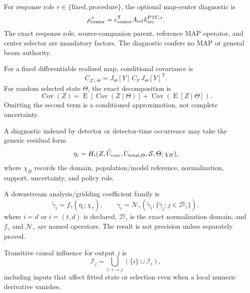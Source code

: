 For response role $r\in\{\mathrm{fixed},\mathrm{procedure}\}$, the optional
map-center diagnostic is
\begin{equation}
\rho_{\rm center}^{\,r}
=e_{\rm center}^{\mathsf T}A_{\rm ref}k_{\rm src}^{\rm PTC,r}.
\label{eq:map-center}
\end{equation}
The exact response role, source-companion parent, reference MAP operator, and
center selector are mandatory factors. The diagnostic confers no MAP or
general beam authority.

For a fixed differentiable realized map, conditional covariance is
\begin{equation}
C_{Z\mid\Theta}=J_{\Theta}[Y]\,C_Y\,J_{\Theta}[Y]^{\mathsf T}.
\label{eq:conditional-covariance}
\end{equation}
For random selected state $\Theta$, the exact decomposition is
\begin{equation}
\operatorname{Cov}(Z)=
\operatorname{E}\!\left[\operatorname{Cov}(Z\mid\Theta)\right]
+\operatorname{Cov}\!\left(\operatorname{E}[Z\mid\Theta]\right).
\label{eq:total-covariance}
\end{equation}
Omitting the second term is a conditioned approximation, not complete
uncertainty.

A diagnostic indexed by detector or detector-time occurrence may take the
generic residual form
\begin{equation}
\eta_i=H_i(Z,\widehat U_{\rm corr},U_{{\rm total},\Theta},
\mathcal S,\Theta;\chi_H),
\label{eq:diagnostic}
\end{equation}
where $\chi_H$ records the domain, population/model reference, normalization,
support, uncertainty, and policy role.

A downstream analysis/gridding coefficient family is
\begin{equation}
\widetilde\gamma_i=f_{\gamma}(\eta_i;\chi_{\gamma}),
\qquad
\gamma_i=
\mathcal N_{\gamma}\!\left(
\widetilde\gamma_i;\{\widetilde\gamma_j:j\in\mathcal D_{\gamma}\}\right),
\label{eq:analysis-coefficient}
\end{equation}
where $i=d$ or $i=(t,d)$ is declared, $\mathcal D_{\gamma}$ is the exact
normalization domain, and $f_{\gamma}$ and $\mathcal N_{\gamma}$ are named
operators. The result is not precision unless separately proved.

Transitive causal influence for output $j$ is
\begin{equation}
\mathcal I_j=\bigcup_{i:\,i\rightarrow j}
\left(\{i\}\cup\mathcal I_i\right),
\label{eq:influence}
\end{equation}
including inputs that affect fitted state or selection even when a local
numeric derivative vanishes.

